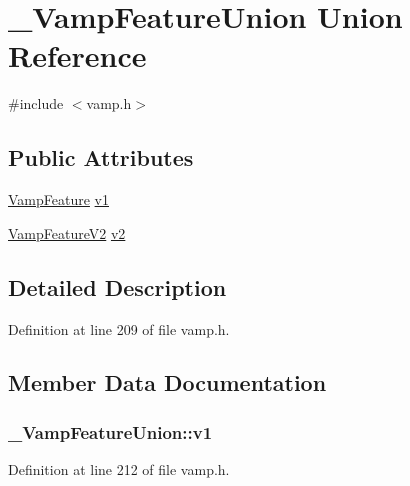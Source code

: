 \hypertarget{union___vamp_feature_union}{}\section{\+\_\+\+Vamp\+Feature\+Union Union Reference}
\label{union___vamp_feature_union}


{\ttfamily \#include $<$vamp.\+h$>$}

\subsection*{Public Attributes}
\begin{DoxyCompactItemize}
\item 
\hyperlink{vamp_8h_a8d04355c13e5ff7a146abcb168cb919f}{Vamp\+Feature} \hyperlink{union___vamp_feature_union_a4a32a2ce141ec3cd36b8be54cd9c3369}{v1}
\item 
\hyperlink{vamp_8h_a41cb3518127d0971b1d2c8edfbbe2763}{Vamp\+Feature\+V2} \hyperlink{union___vamp_feature_union_a87e508e37e02cce11c3c4ddf087a627a}{v2}
\end{DoxyCompactItemize}


\subsection{Detailed Description}


Definition at line 209 of file vamp.\+h.



\subsection{Member Data Documentation}
\subsubsection[{\texorpdfstring{v1}{v1}}]{ \+\_\+\+Vamp\+Feature\+Union\+::v1}\hypertarget{union___vamp_feature_union_a4a32a2ce141ec3cd36b8be54cd9c3369}{}\label{union___vamp_feature_union_a4a32a2ce141ec3cd36b8be54cd9c3369}


Definition at line 212 of file vamp.\+h.

